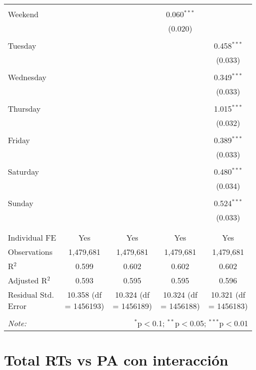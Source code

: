 \documentclass[
]{article}
\begin{document}
\begin{table}[!htbp]
{\begin{tabular}{@{\extracolsep{5pt}}lcccc}
  & & & & \\ 
 Weekend &  &  & 0.060$^{***}$ &  \\ 
  &  &  & (0.020) &  \\ 
  & & & & \\ 
 Tuesday &  &  &  & 0.458$^{***}$ \\ 
  &  &  &  & (0.033) \\ 
  & & & & \\ 
 Wednesday &  &  &  & 0.349$^{***}$ \\ 
  &  &  &  & (0.033) \\ 
  & & & & \\ 
 Thursday &  &  &  & 1.015$^{***}$ \\ 
  &  &  &  & (0.032) \\ 
  & & & & \\ 
 Friday &  &  &  & 0.389$^{***}$ \\ 
  &  &  &  & (0.033) \\ 
  & & & & \\ 
 Saturday &  &  &  & 0.480$^{***}$ \\ 
  &  &  &  & (0.034) \\ 
  & & & & \\ 
 Sunday &  &  &  & 0.524$^{***}$ \\ 
  &  &  &  & (0.033) \\ 
  & & & & \\ 
\hline \\[-1.8ex] 
Individual FE & Yes & Yes & Yes & Yes \\ 
Observations & 1,479,681 & 1,479,681 & 1,479,681 & 1,479,681 \\ 
R$^{2}$ & 0.599 & 0.602 & 0.602 & 0.602 \\ 
Adjusted R$^{2}$ & 0.593 & 0.595 & 0.595 & 0.596 \\ 
Residual Std. Error & 10.358 (df = 1456193) & 10.324 (df = 1456189) & 10.324 (df = 1456188) & 10.321 (df = 1456183) \\ 
\hline 
\hline \\[-1.8ex] 
\textit{Note:}  & \multicolumn{4}{r}{$^{*}$p$<$0.1; $^{**}$p$<$0.05; $^{***}$p$<$0.01} \\ 
\end{tabular}
} 
\end{table} 
\newpage
\section{Total RTs vs PA con interacción}
\end{document}
